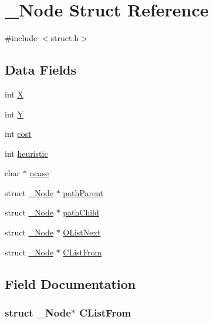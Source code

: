 \hypertarget{struct___node}{}\section{\+\_\+\+Node Struct Reference}
\label{struct___node}


{\ttfamily \#include $<$struct.\+h$>$}

\subsection*{Data Fields}
\begin{DoxyCompactItemize}
\item 
int \hyperlink{struct___node_a80c0944640e62d3ed6c5419c1bcc0c88}{X}
\item 
int \hyperlink{struct___node_aa482c4cc86a24474e4fb19b5b5978778}{Y}
\item 
int \hyperlink{struct___node_a66700f11d42fee2413e58dbf49c43ee1}{cost}
\item 
int \hyperlink{struct___node_a266b59afb2a9e30cb84c2b14388fb5fe}{heuristic}
\item 
char $\ast$ \hyperlink{struct___node_aa0cc47f15f87b45c6960e18fd786f286}{ncase}
\item 
struct \hyperlink{struct___node}{\+\_\+\+Node} $\ast$ \hyperlink{struct___node_a7d0cf1a91c4dd335673a79aa5db87d01}{path\+Parent}
\item 
struct \hyperlink{struct___node}{\+\_\+\+Node} $\ast$ \hyperlink{struct___node_ac1bcf3cc6dca353ea81f1e92b01d7ecb}{path\+Child}
\item 
struct \hyperlink{struct___node}{\+\_\+\+Node} $\ast$ \hyperlink{struct___node_ad6389fd077852071265bb2dba8ce054a}{O\+List\+Next}
\item 
struct \hyperlink{struct___node}{\+\_\+\+Node} $\ast$ \hyperlink{struct___node_a184c1c4c06e65b6370a72e7520bbb290}{C\+List\+From}
\end{DoxyCompactItemize}


\subsection{Field Documentation}
\subsubsection[{\texorpdfstring{C\+List\+From}{CListFrom}}]{\setlength{\rightskip}{0pt plus 5cm}struct {\bf \+\_\+\+Node}$\ast$ C\+List\+From}\hypertarget{struct___node_a184c1c4c06e65b6370a72e7520bbb290}{}\label{struct___node_a184c1c4c06e65b6370a72e7520bbb290}
